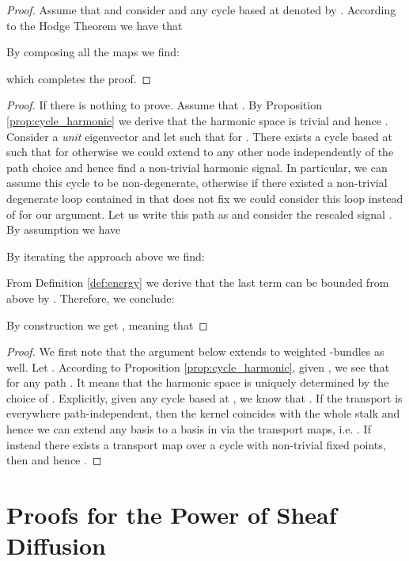 \documentclass{article}
\begin{document}
\CycleHarmonic*
\begin{proof}
Assume that  and consider  and any cycle based at  denoted by . According to the Hodge Theorem we have that 

\noindent By composing all the maps we find:

\noindent which completes the proof.
\end{proof}

\LowerBoundEigen*
\begin{proof}
If  there is nothing to prove. Assume that . By Proposition \ref{prop:cycle_harmonic} we derive that the harmonic space is trivial and hence . Consider a \emph{unit} eigenvector  and let  such that  for . There exists a cycle  based at  such that  for otherwise we could extend  to any other node independently of the path choice and hence find a non-trivial harmonic signal. In particular, we can assume this cycle to be non-degenerate, otherwise if there existed a non-trivial degenerate loop contained in  that does not fix  we could consider this loop instead of  for our argument. Let us write this path as  and consider the rescaled signal . By assumption we have 

\noindent By iterating the approach above we find:


\noindent From Definition \ref{def:energy} we derive that the last term can be bounded from above by . Therefore, we conclude:

\noindent By construction we get , meaning that

\end{proof}
 
\BundleHDim*
\begin{proof}
We first note that the argument below extends to weighted -bundles as well. Let . According to Proposition \ref{prop:cycle_harmonic}, given , we see that  for any path . It means that the harmonic space is uniquely determined by the choice of . Explicitly, given any cycle  based at , we know that . If the transport is everywhere path-independent, then the kernel coincides with the whole stalk  and hence we can extend any basis  to a basis in  via the transport maps, i.e. . If instead there exists a transport map over a cycle  with non-trivial fixed points, then  and hence . 
\end{proof} 

\section{Proofs for the Power of Sheaf Diffusion}\label{app:diffusion_power}
\end{document}
